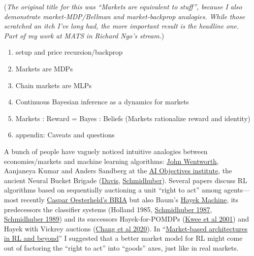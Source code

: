 (\emph{The original title for this was ``Markets are equivalent to stuff'', because I also demonstrate market-MDP/Bellman and market-backprop analogies. While those scratched an itch I've long had, the more important result is the headline one. Part of my work at MATS in Richard Ngo's stream.})

\begin{enumerate}
\def\labelenumi{\arabic{enumi}.}
\tightlist
\item
  setup and price recursion/backprop
\item
  Markets are MDPs
\item
  Chain markets are MLPs
\item
  Continuous Bayesian inference as a dynamics for markets
\item
  Markets : Reward = Bayes : Beliefs (Markets rationalize reward and identity)
\item
  appendix: Caveats and questions
\end{enumerate}

A bunch of people have vaguely noticed intuitive analogies between economies/markets and machine learning algorithms: \href{https://www.lesswrong.com/posts/brhWPoNsBN7za3xjs/competitive-markets-as-distributed-backprop}{John Wentworth}, Aanjaneya Kumar and Anders Sandberg at the \href{https://ai.objectives.institute/projects}{AI Objectives institute}, the ancient Neural Bucket Brigade (\href{https://proceedings.neurips.cc/paper/1988/hash/82aa4b0af34c2313a562076992e50aa3-Abstract.html}{Davis}, \href{https://www.tandfonline.com/doi/abs/10.1080/09540098908915650}{Schmidhuber}). Several papers discuss RL algorithms based on sequentially auctioning a unit ``right to act'' among agents---most recently \href{https://arxiv.org/abs/2307.05068v1}{Caspar Oesterheld's BRIA} but also Baum's \href{https://link.springer.com/article/10.1023/a:1007593124513}{Hayek Machine}, its predecessors the classifier systems (Holland 1985, \href{https://mediatum.ub.tum.de/813180}{Schmidhuber 1987}, \href{https://www.tandfonline.com/doi/abs/10.1080/09540098908915650}{Schmidhuber 1989}) and its successors Hayek-for-POMDPs (\href{https://link.springer.com/chapter/10.1007/3-540-44668-0_120}{Kwee et al 2001}) and Hayek with Vickrey auctions (\href{https://proceedings.mlr.press/v119/chang20b.html}{Chang et al 2020}). In ``\href{https://arxiv.org/pdf/2503.05828}{Market-based architectures in RL and beyond}'' I suggested that a better market model for RL might come out of factoring the ``right to act'' into ``goods'' axes, just like in real markets.

